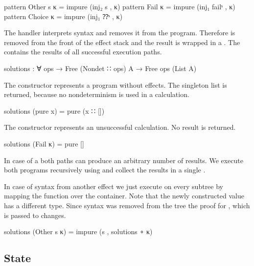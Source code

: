 \begin{code}
pattern Other s κ  = impure (inj₂ s , κ)
pattern Fail κ  = impure (inj₁ failˢ , κ)
pattern Choice κ  = impure (inj₁ ⁇ˢ , κ)
\end{code}
\begin{AgdaAlign}
  The handler interprets  syntax and removes it from the
  program.
  Therefore  is removed from the front of the effect stack
  and the result is wrapped in a .
  The  contains the results of all successful execution
  paths.
  \begin{code}
solutions : ∀ {ops} → Free (Nondet ∷ ops) A → Free ops (List A)
  \end{code}
  The  constructor represents a program without
  effects.
  The singleton list is returned, because no nondeterminism is used in a
   calculation.
  \begin{code}
solutions (pure x)     = pure (x ∷ [])
  \end{code}
  The  constructor represents an unsuccessful
  calculation.
  No result is returned.
  \begin{code}
solutions (Fail κ)     = pure []
  \end{code}
  In case of a  both paths can produce an
  arbitrary number of results.
  We execute both programs recursively using  and
  collect the results in a single .
  In case of syntax from another effect we just execute 
  on every subtree by mapping the function over the container.
  Note that the newly constructed value has a different type.
  Since  syntax was removed from the tree the proof for
  , which is passed to 
  changes.
  \begin{code}
solutions (Other s κ)  = impure (s , solutions ∘ κ)
  \end{code}
\end{AgdaAlign}


\subsection{State}

